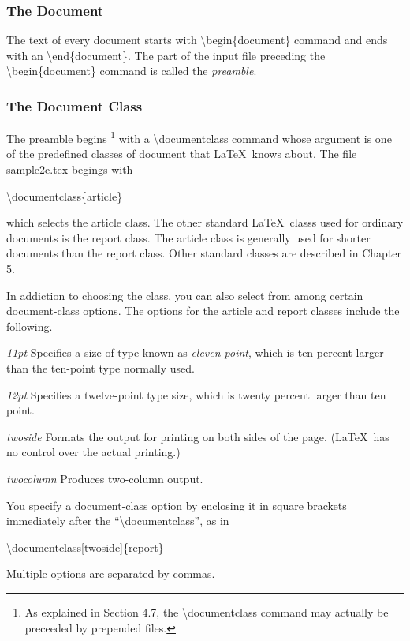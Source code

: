 \documentclass[twocolumn]{article}        %
\begin{document}
\subsubsection{The Document}

The text of every document starts with \textbackslash begin\{document\} command
and ends with an \textbackslash end\{document\}. The part of the input file preceding
the \textbackslash begin\{document\} command is called the \emph{preamble}.

\subsubsection*{The Document Class}

The preamble begins 
\footnote{As explained in Section 4.7, the \textbackslash documentclass 
command may actually be preceeded by prepended files.}
with a \textbackslash documentclass command whose argument is one of the
predefined classes of document that \LaTeX\ knows about. The file sample2e.tex
begings with

\textbackslash documentclass\{article\}

\noindent
which selects the article class. The other standard \LaTeX\ classs used for ordinary
documents is the report class. The article class is generally used for shorter
documents than the report class. Other standard classes are described in Chapter 5.

In addiction to choosing the class, you can also select from among certain document-class options.
The options for the article and report classes include the following.

\hfill \break
\emph{11pt}    Specifies a size of type known as \emph{eleven point}, which is ten percent larger 
than the ten-point type normally used.

\hfill \break
\noindent
\emph{12pt}    Specifies a twelve-point type size, which is twenty percent larger than ten point.

\hfill \break
\emph{twoside} Formats the output for printing on both sides of the page. (\LaTeX\ has no control over the actual printing.)

\hfill \break
\emph{twocolumn} Produces two-column output.

You specify a document-class option by enclosing it in square brackets immediately after 
the ``\textbackslash documentclass'', as in


\textbackslash documentclass[twoside]\{report\}

\noindent
Multiple options are separated by commas.
\end{document}
